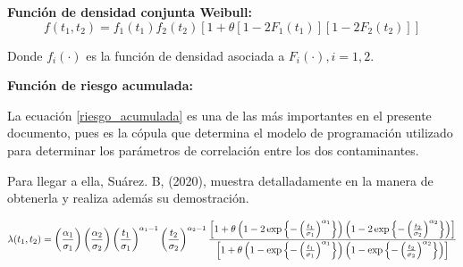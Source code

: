\textbf{Función de densidad conjunta Weibull:}
\begin{equation}
\label{densidad_conjunta}
f(t_1,t_2)=f_1(t_1)f_2(t_2)[1+\theta[1-2F_1(t_1)][1-2F_2(t_2)]]\end{equation}

Donde $f_i(\cdot)$ es la función de densidad asociada a $F_i(\cdot), i=1,2.$


\textbf{Función de riesgo acumulada:}

La ecuación \ref{riesgo_acumulada} es una de las más importantes en el presente documento, pues es la cópula que determina el modelo de programación utilizado para determinar los parámetros de correlación entre los dos contaminantes. 

Para llegar a ella, Suárez. B, (2020), muestra detalladamente en \cite{tesisbiviana} la manera de obtenerla y realiza además su demostración. 

\begin{equation}
\label{riesgo_acumulada}
\lambda(t_1,t_2)=\left(\frac{\alpha_1}{\sigma_1}\right)\left(\frac{\alpha_2}{\sigma_2}\right)\left(\frac{t_1}{\sigma_1}\right)^{\alpha_1-1}
\left(\frac{t_2}{\sigma_2}\right)^{\alpha_2-1}
\frac{\left[1+\theta\left(1-2\exp\left\lbrace-\left(\frac{t_1}{\sigma_1} \right)^{\alpha_1}\right\rbrace\right)\left(1-2\exp\left\lbrace-\left(\frac{t_2}{\sigma_2} \right)^{\alpha_2}\right\rbrace\right) \right]}{\left[1+\theta\left(1-\exp\left\lbrace-\left(\frac{t_1}{\sigma_1} \right)^{\alpha_1}\right\rbrace\right)\left(1-\exp\left\lbrace-\left(\frac{t_2}{\sigma_2} \right)^{\alpha_2}\right\rbrace\right) \right]}
\end{equation}